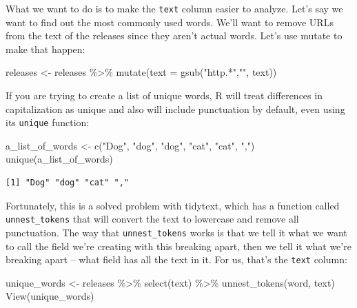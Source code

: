 \documentclass[
  letterpaper,
  DIV=11,
  numbers=noendperiod]{scrreprt}
\newenvironment{Shaded}{\begin{snugshade}}{\end{snugshade}}
\newcommand{\AttributeTok}[1]{\textcolor[rgb]{0.40,0.45,0.13}{#1}}
\newcommand{\FunctionTok}[1]{\textcolor[rgb]{0.28,0.35,0.67}{#1}}
\newcommand{\NormalTok}[1]{\textcolor[rgb]{0.00,0.23,0.31}{#1}}
\newcommand{\OtherTok}[1]{\textcolor[rgb]{0.00,0.23,0.31}{#1}}
\newcommand{\SpecialCharTok}[1]{\textcolor[rgb]{0.37,0.37,0.37}{#1}}
\newcommand{\StringTok}[1]{\textcolor[rgb]{0.13,0.47,0.30}{#1}}
\begin{document}
What we want to do is to make the \texttt{text} column easier to
analyze. Let's say we want to find out the most commonly used words.
We'll want to remove URLs from the text of the releases since they
aren't actual words. Let's use mutate to make that happen:

\begin{Shaded}
\begin{Highlighting}[]
\NormalTok{releases }\OtherTok{\textless{}{-}}\NormalTok{ releases }\SpecialCharTok{\%\textgreater{}\%}
  \FunctionTok{mutate}\NormalTok{(}\AttributeTok{text =} \FunctionTok{gsub}\NormalTok{(}\StringTok{"http.*"}\NormalTok{,}\StringTok{""}\NormalTok{, text))}
\end{Highlighting}
\end{Shaded}

If you are trying to create a list of unique words, R will treat
differences in capitalization as unique and also will include
punctuation by default, even using its \texttt{unique} function:

\begin{Shaded}
\begin{Highlighting}[]
\NormalTok{a\_list\_of\_words }\OtherTok{\textless{}{-}} \FunctionTok{c}\NormalTok{(}\StringTok{"Dog"}\NormalTok{, }\StringTok{"dog"}\NormalTok{, }\StringTok{"dog"}\NormalTok{, }\StringTok{"cat"}\NormalTok{, }\StringTok{"cat"}\NormalTok{, }\StringTok{","}\NormalTok{)}
\FunctionTok{unique}\NormalTok{(a\_list\_of\_words)}
\end{Highlighting}
\end{Shaded}

\begin{verbatim}
[1] "Dog" "dog" "cat" ","  
\end{verbatim}

Fortunately, this is a solved problem with tidytext, which has a
function called \texttt{unnest\_tokens} that will convert the text to
lowercase and remove all punctuation. The way that
\texttt{unnest\_tokens} works is that we tell it what we want to call
the field we're creating with this breaking apart, then we tell it what
we're breaking apart -- what field has all the text in it. For us,
that's the \texttt{text} column:

\begin{Shaded}
\begin{Highlighting}[]
\NormalTok{unique\_words }\OtherTok{\textless{}{-}}\NormalTok{ releases }\SpecialCharTok{\%\textgreater{}\%} \FunctionTok{select}\NormalTok{(text) }\SpecialCharTok{\%\textgreater{}\%}
  \FunctionTok{unnest\_tokens}\NormalTok{(word, text)}
\FunctionTok{View}\NormalTok{(unique\_words)}
\end{Highlighting}
\end{Shaded}
\end{document}
